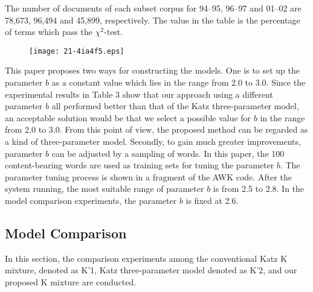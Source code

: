 \documentclass[english]{jnlp_1.4_rep}
\begin{document}
\begin{table}[b]

\vspace{4pt}\small
The number of documents of each subset corpus for 94--95, 96--97 and 01--02 are 78,673, 96,494 and 45,899, 
respectively. The value in the table is the percentage of terms which pass the $\chi^{2}$-test.
\par
\end{table}

\begin{figure}[p]
\begin{center}
\texttt{[image: 21-4ia4f5.eps]}
\end{center}
\label{code fragment}
\end{figure}

This paper proposes two ways for constructing the models. One is to set up the parameter $b$ as a constant value which lies in the range from 2.0 to
3.0. Since the experimental results in Table 3 show that our approach using a different parameter $b$ all performed better than that of the Katz
three-parameter model, an acceptable solution would be that we select a possible value for $b$ in the range from 2.0 to 3.0. From this point of
view, the proposed method can be regarded as a kind of three-parameter model. Secondly, to gain much greater improvements, parameter $b$ can be
adjusted by a sampling of words. In this paper, the 100 content-bearing words are used as training sets for tuning the parameter $b$. The parameter
tuning process is shown in a fragment of the AWK code. After the system running, the most suitable range of parameter $b$ is from 2.5 to 2.8. In the
model comparison experiments, the parameter $b$ is fixed at 2.6.


\subsection{Model Comparison}

In this section, the comparison experiments among the conventional Katz K mixture, denoted as K'1,
Katz three-parameter model denoted as K'2, and our proposed K mixture are conducted.
\end{document}
